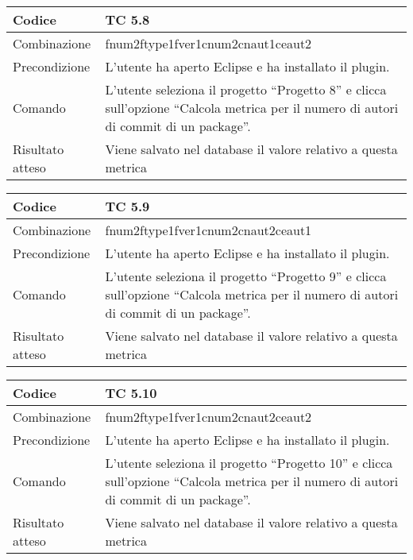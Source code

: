 \begin{table}[ht]
\begin{tabular}{|p{3cm}|p{9cm}|}
\hline
\cellcolor{lightgray}Codice				& TC 5.8								\\
\hline
\cellcolor{lightgray}Combinazione		& fnum2ftype1fver1cnum2cnaut1ceaut2 									\\
\hline
\cellcolor{lightgray}Precondizione		& L'utente ha aperto Eclipse e ha installato il plugin.				\\
\hline
\cellcolor{lightgray}Comando			& L'utente seleziona il progetto ``Progetto 8''  e clicca sull'opzione ``Calcola metrica per il numero di autori di commit di un package''.	\\
\hline
\cellcolor{lightgray}Risultato atteso	& Viene salvato nel database il valore relativo a questa metrica	\\
\hline
\end{tabular}
\end{table}

\begin{table}[ht]
\begin{tabular}{|p{3cm}|p{9cm}|}
\hline
\cellcolor{lightgray}Codice				& TC 5.9								\\
\hline
\cellcolor{lightgray}Combinazione		& fnum2ftype1fver1cnum2cnaut2ceaut1 									\\
\hline
\cellcolor{lightgray}Precondizione		& L'utente ha aperto Eclipse e ha installato il plugin.								\\
\hline
\cellcolor{lightgray}Comando			& L'utente seleziona il progetto ``Progetto 9''  e clicca sull'opzione ``Calcola metrica per il numero di autori di commit di un package''.	\\
\hline
\cellcolor{lightgray}Risultato atteso	& Viene salvato nel database il valore relativo a questa metrica	\\
\hline
\end{tabular}
\end{table}

\begin{table}[ht]
\begin{tabular}{|p{3cm}|p{9cm}|}
\hline
\cellcolor{lightgray}Codice				& TC 5.10								\\
\hline
\cellcolor{lightgray}Combinazione		& fnum2ftype1fver1cnum2cnaut2ceaut2 									\\
\hline
\cellcolor{lightgray}Precondizione		& L'utente ha aperto Eclipse e ha installato il plugin.									\\
\hline
\cellcolor{lightgray}Comando			& L'utente seleziona il progetto ``Progetto 10''  e clicca sull'opzione ``Calcola metrica per il numero di autori di commit di un package''.	\\
\hline
\cellcolor{lightgray}Risultato atteso	& Viene salvato nel database il valore relativo a questa metrica	\\
\hline
\end{tabular}
\end{table}

